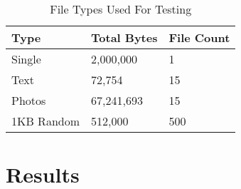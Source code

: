 \begin{table}[h!]
	\caption{File Types Used For Testing}
	\label{tab:file-types-used-for-testing}
	\centering
	\begin{tabular}{ l l l }
		\textbf{Type} & \textbf{Total Bytes} & \textbf{File Count} \\
		\hline
		Single        & 2,000,000            & 1                   \\
		\hline
		Text          & 72,754               & 15                  \\
		\hline
		Photos        & 67,241,693           & 15                  \\
		\hline
		1KB Random    & 512,000              & 500                 \\
		\hline
	\end{tabular}
\end{table}

\newpage

\section{Results}
